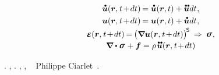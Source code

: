 \nopagebreak
\begin{gather*}
\mathdotabove{\bm{u}} ({\bm{r}, \hspace{.1ex} t \hspace{-0.3ex} + \hspace{-0.3ex} dt})
\hspace{-0.2ex} =
\mathdotabove{\bm{u}}(\bm{r}, t) + \mathdotdotabove{\bm{u}} dt \hspace{.1ex} , \\
\bm{u}({ \bm{r}, \hspace{.1ex} t \hspace{-0.3ex} + \hspace{-0.3ex} dt })
\hspace{-0.2ex} =
\bm{u}(\bm{r}, t)
+ \mathdotabove{\bm{u}} dt
\hspace{.1ex} ,
\\[-0.1em]
%
\infinitesimaldeformation({\bm{r}, \hspace{.1ex} t \hspace{-0.3ex} + \hspace{-0.3ex} dt})
\hspace{-0.2ex} = \hspace{-0.2ex}
\bigl( \boldnabla \bm{u}{( \bm{r}, \hspace{.1ex} t \hspace{-0.3ex} + \hspace{-0.3ex} dt )} \bigr)^{\hspace{-0.25ex}\mathsf{S}}
\hspace{.2em} \Rightarrow \hspace{.25em}
\linearstress
\hspace{.1ex} ,
\\[-0.1em]
%
\boldnabla \dotp \linearstress \hspace{.15ex} + \bm{f}
= \rho \hspace{.2ex} \mathdotdotabove{\bm{u}}( \bm{r}, \hspace{.1ex} t \hspace{-0.3ex} + \hspace{-0.3ex} dt )
\end{gather*}

\vspace{-0.1em}\noindent
{}.
,
.
,
,
~ Philippe Ciarlet~\cite{ciarlet-mathematicalelasticity}.

